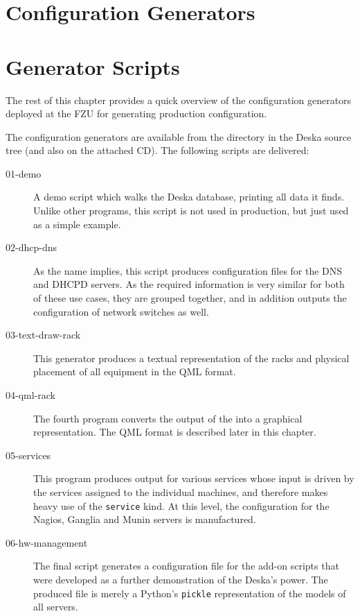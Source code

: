 \documentclass[deska]{subfiles}
\begin{document}
\section{Configuration Generators}
\label{sec:fzu-cfggen}

\section{Generator Scripts}

The rest of this chapter provides a quick overview of the configuration generators deployed at the FZU for generating
production configuration.

The configuration generators are available from the directory  in the Deska source tree
(and also on the attached CD).  The following scripts are delivered:

\begin{description}
    \item[01-demo] A demo script which walks the Deska database, printing all data it finds.  Unlike other programs,
        this script is not used in production, but just used as a simple example.
    \item[02-dhcp-dns] As the name implies, this script produces configuration files for the DNS and DHCPD servers.  As
        the required information is very similar for both of these use cases, they are grouped together, and in addition
        outputs the configuration of network switches as well.
    \item[03-text-draw-rack] This generator produces a textual representation of the racks and physical placement of all
        equipment in the QML format.
    \item[04-qml-rack] The fourth program converts the output of the  into a graphical
        representation.  The QML format is described later in this chapter.
    \item[05-services] This program produces output for various services whose input is driven by the services assigned
        to the individual machines, and therefore makes heavy use of the {\tt service} kind.  At this level, the
        configuration for the Nagios, Ganglia and Munin servers is manufactured.
    \item[06-hw-management] The final script generates a configuration file for the add-on scripts that were developed
        as a further demonstration of the Deska's power.  The produced file is merely a Python's {\tt pickle}
        representation of the models of all servers.
\end{description}
\end{document}
